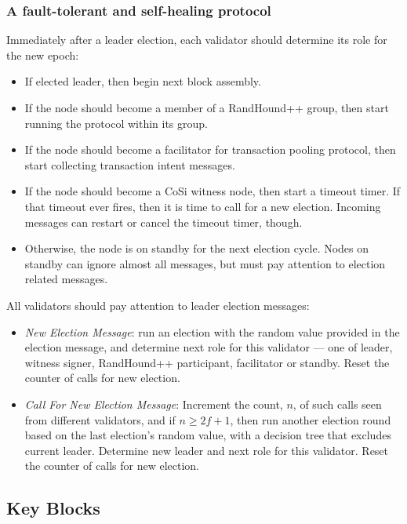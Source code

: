\documentclass[a4paper, 10pt, conference]{ieeeconf}
\begin{document}
\subsubsection{A fault-tolerant and self-healing protocol} Immediately after a leader election, each validator should determine its role for the new epoch:

\begin{itemize}
	\item If elected leader, then begin next block assembly. 
	\item If the node should become a member of a RandHound++ group, then start running the protocol within its group.
	\item If the node should become a facilitator for transaction pooling protocol, then start collecting transaction intent messages.
	\item If the node should become a CoSi witness node, then start a timeout timer. If that timeout ever fires, then it is time to call for a new election. Incoming messages can restart or cancel the timeout timer, though.
	\item Otherwise, the node is on standby for the next election cycle. Nodes on standby can ignore almost all messages, but must pay attention to election related messages.
\end{itemize}  

All validators should pay attention to leader election messages:

\begin{itemize}
	\item{\textit{New Election Message}: run an election with the random value provided in the election message, and determine next role for this validator --- one of leader, witness signer, RandHound++ participant, facilitator or standby. Reset the counter of calls for new election.}
	\item{\textit{Call For New Election Message}: Increment the count, $n$, of such calls seen from different validators, and if $n \ge 2 f +1$, then run another election round based on the last election's random value, with a decision tree that excludes current leader. Determine new leader and next role for this validator. Reset the counter of calls for new election.}
\end{itemize}

\subsection{Key Blocks}
\end{document}

